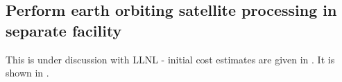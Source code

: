 \subsection{Perform earth orbiting satellite processing in separate facility} \label{sec:5perform}

This is under discussion with LLNL - initial cost estimates are given in .
It is shown in .

